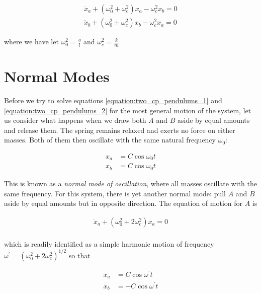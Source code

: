 \documentclass[a4paper,10pt]{article}
\begin{document}
\begin{align}
\label{equation:two_cp_pendulums_1}
\ddot x_a + (\omega_0^{2} + \omega_c^{2})x_a - \omega_c^{2}x_b= 0\\
\label{equation:two_cp_pendulums_2}
\ddot x_b + (\omega_0^{2} + \omega_c^{2})x_b - \omega_c^{2}x_a= 0
\end{align}

where we have let $\omega_0^2 = \frac{g}{l}$ and  $\omega_c^2 = \frac{k}{m}$

\section{Normal Modes}

Before we try to solve equations \ref{equation:two_cp_pendulums_1} and \ref{equation:two_cp_pendulums_2} for the most general motion of the system,
let us consider what happens when we draw both $A$ and $B$ aside by equal amounts and release them. The spring remains relaxed and exerts no force
on either masses. Both of them then oscillate with the same natural frequency $\omega_0$:

\begin{align*}
x_a &= C\cos{\omega_0t}\\
x_b &= C\cos{\omega_0t}
\end{align*}

This is known as a \textit{normal mode of oscillation}, where all masses oscillate with the same frequency. For this system, there is yet another
normal mode: pull $A$ and $B$ aside by equal amounts but in opposite direction. The equation of motion for $A$ is 

\begin{align*}
\ddot x_a + (\omega_0^{2} + 2\omega_c^{2})x_a = 0\\
\end{align*}

which is readily identified as a simple harmonic motion of frequency $\omega^{'} = (\omega_0^2 + 2\omega_c^2)^{1/2}$ so that

\begin{align*}
x_a &= C\cos{\omega^{'}t}\\
x_b &= -C\cos{\omega^{'}t}
\end{align*}
\end{document}
